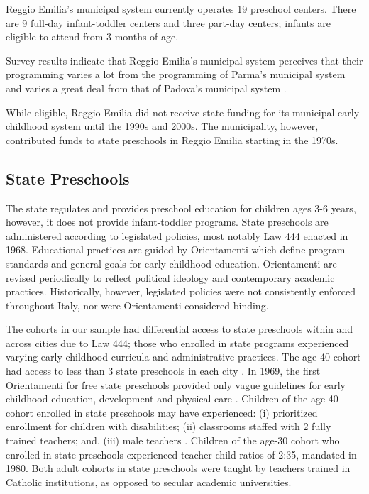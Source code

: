 Reggio Emilia's municipal system currently operates 19 preschool centers. There are 9 full-day infant-toddler centers and three part-day centers; infants are eligible to attend from 3 months of age.

Survey results indicate that Reggio Emilia's municipal system perceives that their programming varies a lot from the programming of Parma's municipal system and varies a great deal from that of Padova's municipal system \citep{CEHD_2016_Historical-Analysis}.

While eligible, Reggio Emilia did not receive state funding for its municipal early childhood system until the 1990s and 2000s. The municipality, however, contributed funds to state preschools in Reggio Emilia starting in the 1970s.

\subsection{State Preschools}

The state regulates and provides preschool education for children ages 3-6 years, however, it does not provide infant-toddler programs. State preschools are administered according to legislated policies, most notably Law 444 enacted in 1968. Educational practices are guided by Orientamenti which define program standards and general goals for early childhood education. Orientamenti are revised periodically to reflect political ideology and contemporary academic practices. Historically, however, legislated policies were not consistently enforced throughout Italy, nor were Orientamenti considered binding.

The cohorts in our sample had differential access to state preschools within and across cities due to Law 444; those who enrolled in state programs experienced varying early childhood curricula and administrative practices. The age-40 cohort had access to less than 3 state preschools in each city \citep{Reggio-Admin-data_1966-2006,Reggio-Annual-Journals_1994-2011,Padova-Admin-Data_1964-2011}. In 1969, the first Orientamenti for free state preschools provided only vague guidelines for early childhood education, development and physical care \citep{Corsaro_1996_Early-Edu,Hohnerlein_2015_Development-and-Diffusion}. Children of the age-40 cohort enrolled in state preschools may have experienced: (i) prioritized enrollment for children with disabilities; (ii) classrooms staffed with 2 fully trained teachers; and, (iii) male teachers \citep{Hohnerlein_2015_Development-and-Diffusion}. Children of the age-30 cohort who enrolled in state preschools experienced teacher child-ratios of 2:35, mandated in 1980. Both adult cohorts in state preschools were taught by teachers trained in Catholic institutions, as opposed to secular academic universities.

